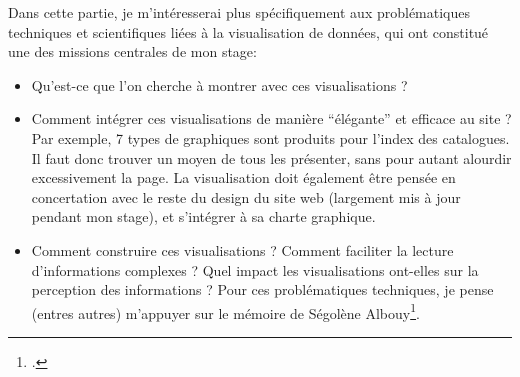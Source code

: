 \documentclass[a4paper, 12pt, twoside]{book}
\newcommand{\html}{\texttt{HTML}}
\newcommand{\json}{\texttt{JSON}}
\newcommand{\tei}{\texttt{TEI}}
\begin{document}

Dans cette partie, je m'intéresserai plus spécifiquement aux problématiques techniques et scientifiques liées à la visualisation de données, qui ont constitué une des missions centrales de mon stage:
\begin{itemize}
 \item Qu'est-ce que l'on cherche à montrer avec ces visualisations ?
 	\item Comment intégrer ces visualisations de manière \enquote{élégante} et efficace au site ? Par exemple, 7 types de graphiques sont produits pour l'index des catalogues. Il faut donc trouver un moyen de tous les présenter, sans pour autant alourdir excessivement la page. La visualisation doit également être pensée en concertation avec le reste du design du site web (largement mis à jour pendant mon stage), et s'intégrer à sa charte graphique.
 \item Comment construire ces visualisations ? Comment faciliter la lecture d'informations complexes ? Quel impact les visualisations ont-elles sur la perception des informations ? Pour ces problématiques techniques, je pense (entres autres) m'appuyer sur le mémoire de Ségolène Albouy\footcite{albouy_mediation_2019}.
\end{itemize}
\end{document}
